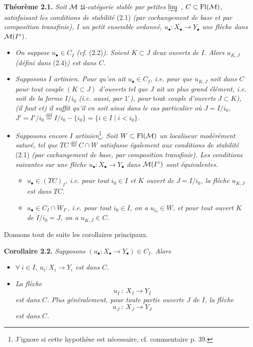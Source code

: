 \textbf{Théorème 2.1.} \textit{Soit $\mathcal{M}$ $\mathfrak{U}$-catégorie stable par petites $\varinjlim$ , $C \subset \mathrm{Fl}(\mathcal{M})$, satisfaisant les conditions de stabilité} \textup{(2.1)} \textit{(par cochangement de base et par composition transfinie), $I$ un petit ensemble ordonné, $u_\bullet : X_\bullet \longrightarrow Y_\bullet$ une flèche dans $\mathcal{M}(I^\circ)$.}
\begin{itemize}[leftmargin=3em]
\item[$1^\circ$)] \textit{On suppose $u_\bullet \in C_I$ (cf.} \textup{(2.2)}\textit{). Soient $K \subset J$ deux ouverts de $I$. Alors $u_{K,J}$ (défini dans} \textup{(2.4)}\textit{) est dans $C$.}
\item[$2^\circ$)] \textit{Supposons $I$ artinien. Pour qu'on ait $u_\bullet \in C_I$, i.e. pour que $u_{K,J}$ soit dans $C$ pour tout couple $(K \subset J)$ d'ouverts tel que $J$ ait un plus grand élément, i.e. soit de la forme $I/i_0$ (i.e. aussi, par} $1^\circ$\textit{), pour} \textup{tout} \textit{couple d'ouverts $J \subset K$), (il faut et) il suffit qu'il en soit ainsi dans le cas particulier où $J = I/i_0$, $J' = I'/i_0 \overset{\text{déf}}{=} I/i_0 - \{i_0\} = \{i \in I \mid i < i_0\}$.}

\item[$3^\circ$)] \textit{Supposons encore $I$ artinien}\footnote[11]{J'ignore si cette hypothèse est nécessaire, cf. commentaire p. 39.}\textit{. Soit $W \subset \mathrm{Fl}(\mathcal{M})$ un localiseur modérément saturé, tel que $TC \overset{\text{déf}}{=} C \cap W$ satisfasse également aux conditions de stabilité} \textup{(2.1)} \textit{(par cochangement de base, par composition transfinie). Les conditions suivantes sur une flèche $u_\bullet : X_\bullet \longrightarrow Y_\bullet$ dans $\mathcal{M}(I^\circ)$ sont équivalentes.}
\begin{itemize}[leftmargin=2em]
\item[a)] \textit{$u_\bullet \in (TC)_I$, i.e. pour tout $i_0 \in I$ et $K$ ouvert de $J = I/i_0$, la flèche $u_{K,J}$ est dans $TC$.}
\item[b)] \textit{$u_\bullet \in C_I \cap W_{I^\circ}$, i.e. pour tout $i_0 \in I$, on a $u_{i_0} \in W$, et pour tout ouvert $K$ de $I/i_0 = J$, on a $u_{K,J} \in C$.}
\end{itemize}
\end{itemize}

Donnons tout de suite les corollaires principaux.

\textbf{Corollaire 2.2.} \textit{Supposons $(u_\bullet : X_\bullet \longrightarrow Y_\bullet) \in C_I$. Alors}
\begin{itemize}[leftmargin=3em]
\item[a)] \textit{$\forall\ i \in I$, $u_i : X_i \longrightarrow Y_i$ est dans $C$.}
\item[b)] \textit{La flèche}
\[
u_I \ :\ X_I \longrightarrow Y_I
\tag*{(2.2.1)}
\]
\textit{est dans $C$. Plus généralement, pour toute partie ouverte $J$ de $I$, la flèche}
\[
u_J \ :\ X_J \longrightarrow Y_J
\tag*{(2.2.2)}
\]
\textit{est dans $C$.}
\end{itemize}

